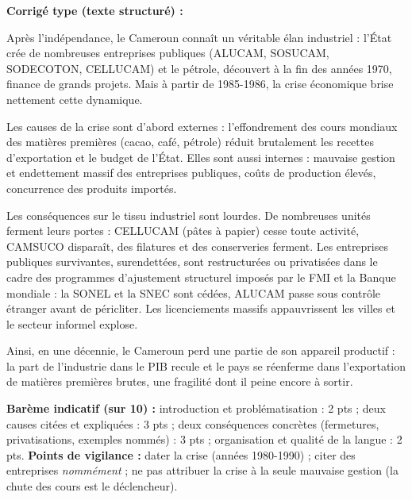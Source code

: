 \documentclass[11pt]{article}
\begin{document}
\begin{corrige}
\textbf{Corrigé type (texte structuré) :}

Après l'indépendance, le Cameroun connaît un véritable élan industriel : l'État crée de nombreuses entreprises publiques (ALUCAM, SOSUCAM, SODECOTON, CELLUCAM) et le pétrole, découvert à la fin des années 1970, finance de grands projets. Mais à partir de 1985-1986, la crise économique brise nettement cette dynamique.

Les causes de la crise sont d'abord externes : l'effondrement des cours mondiaux des matières premières (cacao, café, pétrole) réduit brutalement les recettes d'exportation et le budget de l'État. Elles sont aussi internes : mauvaise gestion et endettement massif des entreprises publiques, coûts de production élevés, concurrence des produits importés.

Les conséquences sur le tissu industriel sont lourdes. De nombreuses unités ferment leurs portes : CELLUCAM (pâtes à papier) cesse toute activité, CAMSUCO disparaît, des filatures et des conserveries ferment. Les entreprises publiques survivantes, surendettées, sont restructurées ou privatisées dans le cadre des programmes d'ajustement structurel imposés par le FMI et la Banque mondiale : la SONEL et la SNEC sont cédées, ALUCAM passe sous contrôle étranger avant de péricliter. Les licenciements massifs appauvrissent les villes et le secteur informel explose.

Ainsi, en une décennie, le Cameroun perd une partie de son appareil productif : la part de l'industrie dans le PIB recule et le pays se réenferme dans l'exportation de matières premières brutes, une fragilité dont il peine encore à sortir.

\textbf{Barème indicatif (sur 10) :} introduction et problématisation : 2 pts ; deux causes citées et expliquées : 3 pts ; deux conséquences concrètes (fermetures, privatisations, exemples nommés) : 3 pts ; organisation et qualité de la langue : 2 pts.
\textbf{Points de vigilance :} dater la crise (années 1980-1990) ; citer des entreprises \emph{nommément} ; ne pas attribuer la crise à la seule mauvaise gestion (la chute des cours est le déclencheur).
\end{corrige}
\end{document}
